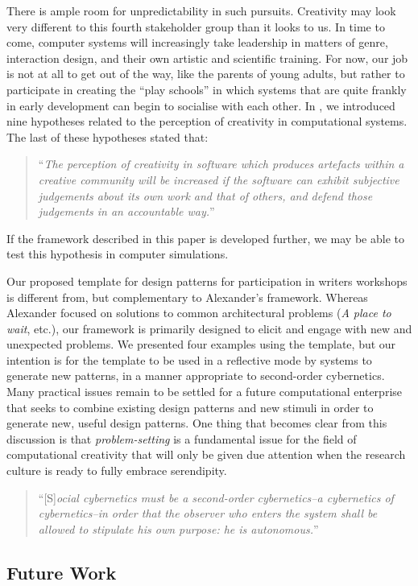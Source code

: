 There is ample room for unpredictability in such pursuits.  Creativity
may look very different to this fourth stakeholder group than it looks
to us.  In time to come, computer systems will increasingly take
leadership in matters of genre, interaction design, and their own
artistic and scientific training.  For now, our job is not at all to
get out of the way, like the parents of young adults, but rather to
participate in creating the ``play schools'' in which systems that are
quite frankly in early development can begin to socialise with each
other.
%
In \cite{stakeholder-groups-bookchapter}, we introduced nine
hypotheses related to the perception of creativity in computational
systems. 
The last of these hypotheses stated that:
\begin{quote}
``\emph{The perception of creativity in software which produces
  artefacts within a creative community will be increased if the
  software can exhibit subjective judgements about its own work and
  that of others, and defend those judgements in an accountable
  way.}''~\cite{stakeholder-groups-bookchapter}
\end{quote}
If the framework described in this paper is developed further, we may
be able to test this hypothesis in computer simulations.

Our proposed template for design patterns for participation in writers
workshops is different from, but complementary to Alexander's
framework.  Whereas Alexander focused on solutions to common
architectural problems (\emph{A place to wait}, etc.), our framework
is primarily designed to elicit and engage with new and unexpected
problems.  We presented four examples using the template, but our
intention is for the template to be used in a reflective mode by
systems to generate new patterns, in a manner appropriate to
second-order cybernetics.  Many practical issues remain to be settled
for a future computational enterprise that seeks to combine existing
design patterns and new stimuli in order to generate new, useful
design patterns.  One thing that becomes clear from this discussion is
that \emph{problem-setting} is a fundamental issue for the field of
computational creativity that will only be given due attention when
the research culture is ready to fully embrace serendipity.

\begin{quote}
``[S]\emph{ocial cybernetics must be a second-order cybernetics--a
    cybernetics of cybernetics--in order that the observer who enters
    the system shall be allowed to stipulate his own purpose: he is
    autonomous.}'' \cite[p. 286]{von2003essays}
\end{quote}

\subsection{Future Work} \label{sec:futurework}


